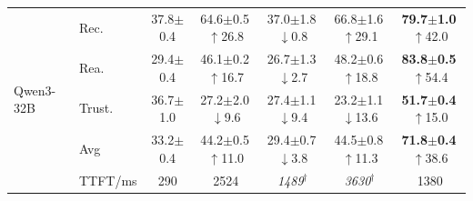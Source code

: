 \begin{table}[t]
\begin{tabular}{@{}ll c c c c | c @{}}
\midrule
\multirow{5}{*}{Qwen3-32B} & Rec. & 37.8{\scriptsize$\pm$0.4} & 64.6{\scriptsize$\pm$0.5}\,{\tiny\textcolor{green!55!black}{$\uparrow$26.8}} & 37.0{\scriptsize$\pm$1.8}\,{\tiny\textcolor{red!70!black}{$\downarrow$0.8}} & 66.8{\scriptsize$\pm$1.6}\,{\tiny\textcolor{green!55!black}{$\uparrow$29.1}} & \textbf{79.7{\scriptsize$\pm$1.0}}\,{\tiny\textcolor{green!55!black}{$\uparrow$42.0}} \\
 & Rea. & 29.4{\scriptsize$\pm$0.4} & 46.1{\scriptsize$\pm$0.2}\,{\tiny\textcolor{green!55!black}{$\uparrow$16.7}} & 26.7{\scriptsize$\pm$1.3}\,{\tiny\textcolor{red!70!black}{$\downarrow$2.7}} & 48.2{\scriptsize$\pm$0.6}\,{\tiny\textcolor{green!55!black}{$\uparrow$18.8}} & \textbf{83.8{\scriptsize$\pm$0.5}}\,{\tiny\textcolor{green!55!black}{$\uparrow$54.4}} \\
 & Trust. & 36.7{\scriptsize$\pm$1.0} & 27.2{\scriptsize$\pm$2.0}\,{\tiny\textcolor{red!70!black}{$\downarrow$9.6}} & 27.4{\scriptsize$\pm$1.1}\,{\tiny\textcolor{red!70!black}{$\downarrow$9.4}} & 23.2{\scriptsize$\pm$1.1}\,{\tiny\textcolor{red!70!black}{$\downarrow$13.6}} & \textbf{51.7{\scriptsize$\pm$0.4}}\,{\tiny\textcolor{green!55!black}{$\uparrow$15.0}} \\
 & Avg & 33.2{\scriptsize$\pm$0.4} & 44.2{\scriptsize$\pm$0.5}\,{\tiny\textcolor{green!55!black}{$\uparrow$11.0}} & 29.4{\scriptsize$\pm$0.7}\,{\tiny\textcolor{red!70!black}{$\downarrow$3.8}} & 44.5{\scriptsize$\pm$0.8}\,{\tiny\textcolor{green!55!black}{$\uparrow$11.3}} & \textbf{71.8{\scriptsize$\pm$0.4}}\,{\tiny\textcolor{green!55!black}{$\uparrow$38.6}} \\
 & TTFT/ms & 290 & 2524 & \textit{1489}$^\dagger$ & \textit{3630}$^\dagger$ & 1380 \\
\bottomrule
\end{tabular}
\vspace{-6pt}
\end{table}
